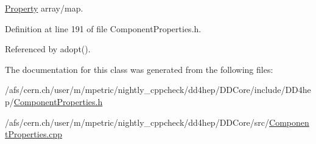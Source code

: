 \hyperlink{class_d_d4hep_1_1_property}{Property} array/map. 



Definition at line 191 of file Component\+Properties.\+h.



Referenced by adopt().



The documentation for this class was generated from the following files\+:\begin{DoxyCompactItemize}
\item 
/afs/cern.\+ch/user/m/mpetric/nightly\+\_\+cppcheck/dd4hep/\+D\+D\+Core/include/\+D\+D4hep/\hyperlink{_component_properties_8h}{Component\+Properties.\+h}\item 
/afs/cern.\+ch/user/m/mpetric/nightly\+\_\+cppcheck/dd4hep/\+D\+D\+Core/src/\hyperlink{_component_properties_8cpp}{Component\+Properties.\+cpp}\end{DoxyCompactItemize}
